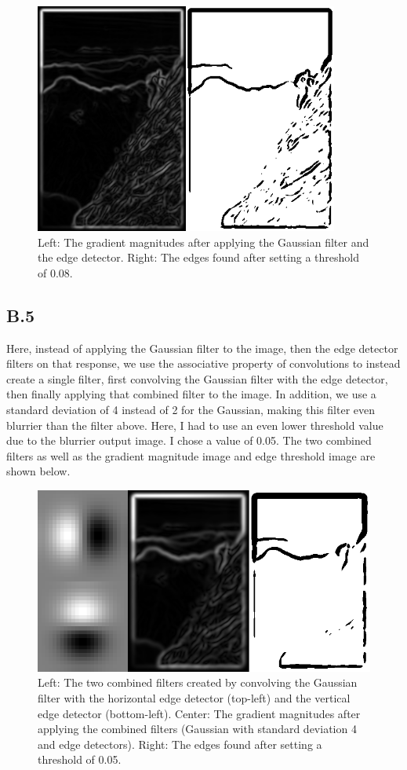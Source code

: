 \documentclass{article}
\begin{document}
\begin{figure}[!ht]
	\centering
	\includegraphics[width=100mm]{figs/smoothed_grad_mag_and_threshold.png}
	\caption{Left: The gradient magnitudes after applying the Gaussian filter 
        and the edge detector. Right: The edges found after setting a threshold of 0.08.}
\end{figure}

\subsection{B.5}

Here, instead of applying the Gaussian filter to the image, then the edge detector 
filters on that response, we use the associative property of convolutions to instead 
create a single filter, first convolving the Gaussian filter with the edge detector, 
then finally applying that combined filter to the image. In addition, we use a 
standard deviation of 4 instead of 2 for the Gaussian, making this filter even 
blurrier than the filter above. Here, I had to use an even lower threshold value 
due to the blurrier output image. I chose a value of 0.05. The two combined filters as well as the gradient 
magnitude image and edge threshold image are shown below.

\begin{figure}[!ht]
	\centering
	\includegraphics[width=120mm]{figs/smoothed_grad_mag_and_threshold_2.png}
	\caption{Left: The two combined filters created by convolving the Gaussian 
        filter with the horizontal edge detector (top-left) and the vertical edge 
        detector (bottom-left). Center: The gradient magnitudes after applying 
        the combined filters 
        (Gaussian with standard deviation 4 and edge detectors). Right: The edges 
        found after setting a threshold of 0.05.}
\end{figure}
\end{document}
